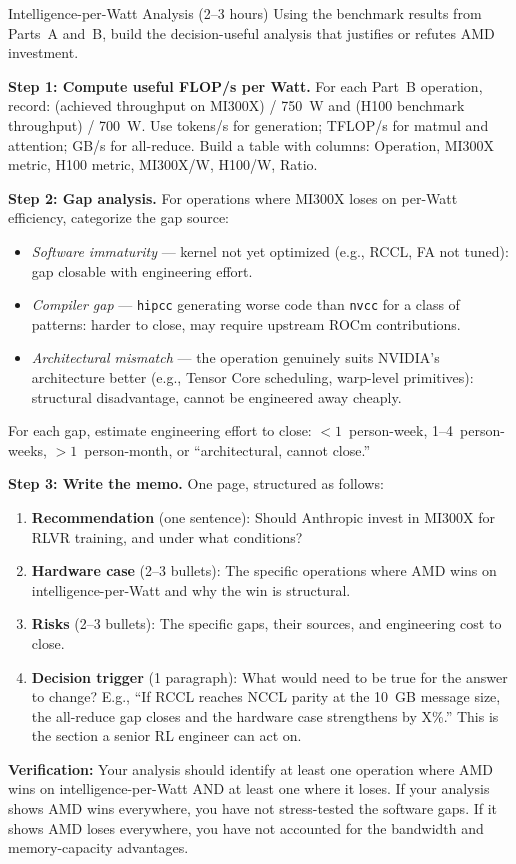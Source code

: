 \begin{exercise}{Intelligence-per-Watt Analysis (2--3 hours)}
Using the benchmark results from Parts~A and~B, build the decision-useful analysis that justifies or refutes AMD investment.

\textbf{Step 1: Compute useful FLOP/s per Watt.} For each Part~B operation, record: (achieved throughput on MI300X) / 750~W and (H100 benchmark throughput) / 700~W. Use tokens/s for generation; TFLOP/s for matmul and attention; GB/s for all-reduce. Build a table with columns: Operation, MI300X metric, H100 metric, MI300X/W, H100/W, Ratio.

\textbf{Step 2: Gap analysis.} For operations where MI300X loses on per-Watt efficiency, categorize the gap source:
\begin{itemize}
  \item \textit{Software immaturity} --- kernel not yet optimized (e.g., RCCL, FA not tuned): gap closable with engineering effort.
  \item \textit{Compiler gap} --- \texttt{hipcc} generating worse code than \texttt{nvcc} for a class of patterns: harder to close, may require upstream ROCm contributions.
  \item \textit{Architectural mismatch} --- the operation genuinely suits NVIDIA's architecture better (e.g., Tensor Core scheduling, warp-level primitives): structural disadvantage, cannot be engineered away cheaply.
\end{itemize}
For each gap, estimate engineering effort to close: $<1$~person-week, 1--4~person-weeks, $>1$~person-month, or ``architectural, cannot close.''

\textbf{Step 3: Write the memo.} One page, structured as follows:
\begin{enumerate}
  \item \textbf{Recommendation} (one sentence): Should Anthropic invest in MI300X for RLVR training, and under what conditions?
  \item \textbf{Hardware case} (2--3 bullets): The specific operations where AMD wins on intelligence-per-Watt and why the win is structural.
  \item \textbf{Risks} (2--3 bullets): The specific gaps, their sources, and engineering cost to close.
  \item \textbf{Decision trigger} (1 paragraph): What would need to be true for the answer to change? E.g., ``If RCCL reaches NCCL parity at the 10~GB message size, the all-reduce gap closes and the hardware case strengthens by X\%.'' This is the section a senior RL engineer can act on.
\end{enumerate}

\textbf{Verification:} Your analysis should identify at least one operation where AMD wins on intelligence-per-Watt AND at least one where it loses. If your analysis shows AMD wins everywhere, you have not stress-tested the software gaps. If it shows AMD loses everywhere, you have not accounted for the bandwidth and memory-capacity advantages.
\end{exercise}

